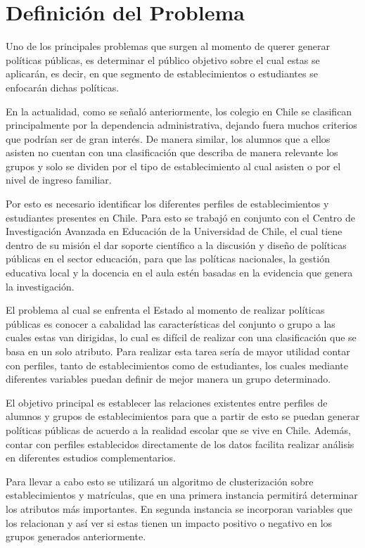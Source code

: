 \chapter{Definici\'on del Problema}

Uno de los principales problemas que surgen al momento de querer generar políticas públicas, es determinar el público objetivo sobre el cual estas se aplicarán, es decir, en que segmento de establecimientos o estudiantes se enfocarán dichas políticas.

En la actualidad, como se señaló anteriormente, los colegio en Chile se clasifican principalmente por la dependencia administrativa, dejando fuera muchos criterios que podrían ser de gran interés. De manera similar, los alumnos que a ellos asisten no cuentan con una clasificación que describa de manera relevante los grupos y solo se dividen por el tipo de establecimiento al cual asisten o por el nivel de ingreso familiar.

Por esto es necesario identificar los diferentes perfiles de establecimientos y estudiantes presentes en Chile. Para esto se trabajó en conjunto con el Centro de Investigación Avanzada en Educación de la Universidad de Chile, el cual tiene dentro de su misión el dar soporte científico a la discusión y diseño de políticas públicas en el sector educación, para que las políticas nacionales, la gestión educativa local y la docencia en el aula estén basadas en la evidencia que genera la investigación.

El problema al cual se enfrenta el Estado al momento de realizar políticas públicas es conocer a cabalidad las características del conjunto o grupo a las cuales estas van dirigidas, lo cual es difícil de realizar con una clasificación que se basa en un solo atributo. Para realizar esta tarea sería de mayor utilidad contar con perfiles, tanto de establecimientos como de estudiantes, los cuales mediante diferentes variables puedan definir de mejor manera un grupo determinado.

El objetivo principal es establecer las relaciones existentes entre perfiles de alumnos y grupos de establecimientos para que a partir de esto se puedan generar políticas públicas de acuerdo a la realidad escolar que se vive en Chile. Además, contar con perfiles establecidos directamente de los datos facilita realizar análisis en diferentes estudios complementarios.

Para llevar a cabo esto se utilizará un algoritmo de clusterización sobre establecimientos y matrículas, que en una primera instancia permitirá determinar los atributos más importantes. En segunda instancia se incorporan variables que los relacionan y así ver si estas tienen un impacto positivo o negativo en los grupos generados anteriormente.

